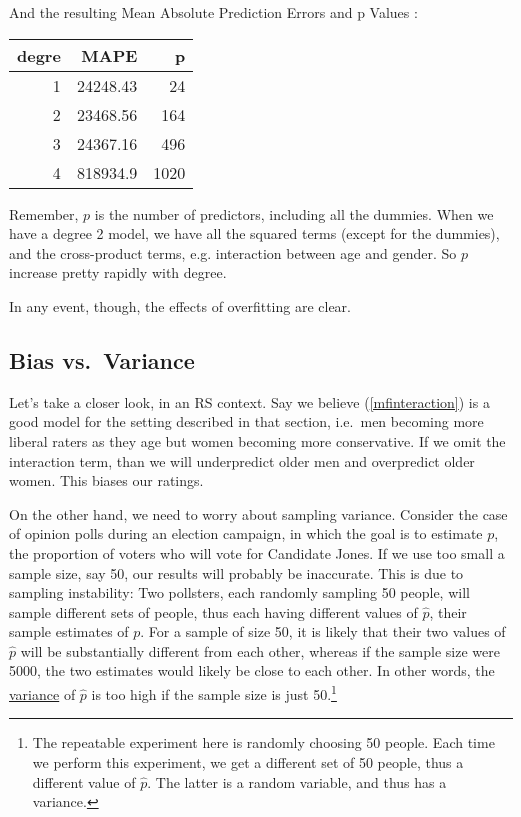 And the resulting Mean Absolute Prediction Errors and p Values :

\bigskip

\begin{tabular}{|r|r|r|}
\hline
degre & MAPE & p \\
\hline
1 & 24248.43 & 24 \\
\hline
2 & 23468.56 & 164 \\
\hline
3 & 24367.16 & 496 \\  
\hline
4 & 818934.9 & 1020 \\
\hline
\end{tabular}

Remember, $p$ is the number of predictors, including all the dummies.
When we have a degree 2 model, we have all the squared terms (except for
the dummies), and the cross-product terms, e.g. interaction between age
and gender.  So $p$ increase pretty rapidly with degree.

In any event, though, the effects of overfitting are clear.

\subsection{Bias vs.\ Variance}

Let's take a closer look, in an RS context.  Say we believe
(\ref{mfinteraction}) is a good model for the setting described in that
section, i.e.\ men becoming more liberal raters as they age but women
becoming more conservative.  If we omit the interaction term, than we
will underpredict older men and overpredict older women.  This biases
our ratings.

On the other hand, we need to worry about sampling variance.  Consider
the case of opinion polls during an election campaign, in which the goal
is to estimate $p$, the proportion of voters who will vote for Candidate
Jones.  If we use too small a sample size, say 50, our results will
probably be inaccurate.  This is due to sampling instability:  Two
pollsters, each randomly sampling 50 people, will sample different sets
of people, thus each having different values of $\widehat{p}$, their
sample estimates of $p$.  For a sample of size 50, it is likely that
their two values of $\widehat{p}$ will be substantially different from
each other, whereas if the sample size were 5000, the two estimates
would likely be close to each other.  In other words, the
\underline{variance} of $\widehat{p}$ is too high if the sample size is
just 50.\footnote{The repeatable experiment here is randomly choosing 50
people.  Each time we perform this experiment, we get a different set of
50 people, thus a different value of $\widehat{p}$.  The latter is a
random variable, and thus has a variance.}

